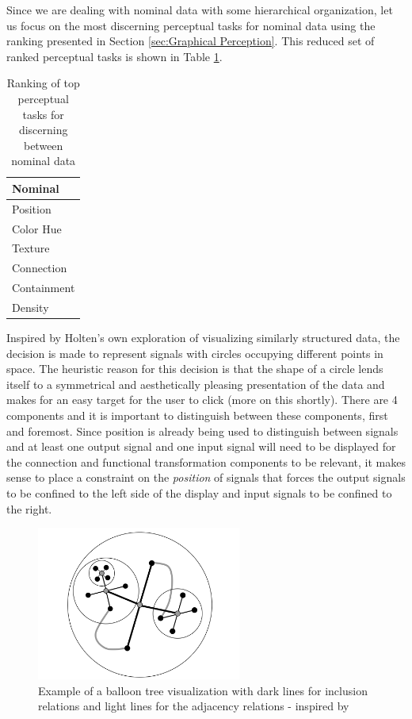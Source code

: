 Since we are dealing with nominal data with some hierarchical organization, let us focus on the most discerning perceptual tasks for nominal data using the ranking presented in Section \ref{sec:Graphical Perception}. This reduced set of ranked perceptual tasks is shown in Table \ref{tab:perceptualNominal}.

\begin{table}
    \begin{center}
    \begin{tabular}{ | l | }
    \hline
    Nominal \\ \hline
    Position \\
    Color Hue \\
    Texture \\
    Connection \\
    Containment \\
    Density \\
    \hline
    \end{tabular}
    \end{center}
    \caption{Ranking of top perceptual tasks for discerning between nominal data \cite{jock1986}}
    \label{tab:perceptualNominal}
\end{table}

Inspired by Holten's own exploration of visualizing similarly structured data, the decision is made to represent signals with circles occupying different points in space. The heuristic reason for this decision is that the shape of a circle lends itself to a symmetrical and aesthetically pleasing presentation of the data and makes for an easy target for the user to click (more on this shortly). There are 4 components and it is important to distinguish between these components, first and foremost. Since position is already being used to distinguish between signals and at least one output signal and one input signal will need to be displayed for the connection and functional transformation components to be relevant, it makes sense to place a constraint on the \emph{position} of signals that forces the output signals to be confined to the left side of the display and input signals to be confined to the right.

\begin{figure}[htb]
\centering
\includegraphics[width=0.6\textwidth]{holten_balloon.png}
\caption{Example of a balloon tree visualization with dark lines for inclusion relations and light lines for the adjacency relations - inspired by \cite{edgebundles2006}}
\label{fig:balloonTree}
\end{figure}

